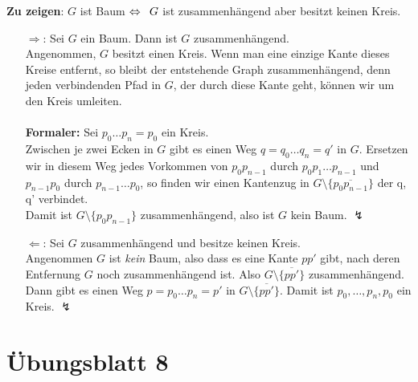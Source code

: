 \begin{problem*}[4]
  \textbf{Zu zeigen}: \( G \) ist Baum \( \Leftrightarrow \enskip G \) ist zusammenhängend aber besitzt keinen Kreis.
  \begin{itemize}
    \item[\( \Rightarrow \):] Sei \( G \) ein Baum. Dann ist \( G \) zusammenhängend. \\
    Angenommen, \( G \) besitzt einen Kreis. Wenn man eine einzige Kante dieses Kreise entfernt, so bleibt der entstehende Graph zusammenhängend, denn jeden verbindenden Pfad in \( G \), der durch diese Kante geht, können wir um den Kreis umleiten. \\ 
    \\
    \textbf{Formaler:} Sei \( p_0 \dots p_n = p_0 \) ein Kreis. \\
    Zwischen je zwei Ecken in \( G \) gibt es einen Weg \( q = q_0 \dots q_n = q' \) in \( G \). Ersetzen wir in diesem Weg jedes Vorkommen von \( p_0p_{n-1} \) durch \( p_0p_1 \dots p_{n-1} \) und \( p_{n-1}p_0 \) durch \( p_{n-1} \dots p_0 \), so finden wir einen Kantenzug in \( G \setminus \{ \overline{p_0p_{n-1}} \} \) der q, q' verbindet. \\
    Damit ist \( G \setminus \{ p_0p_{n-1} \} \) zusammenhängend, also ist \( G \) kein Baum. \quad \( \lightning \)

    \item[\( \Leftarrow \):] Sei \( G \) zusammenhängend und besitze keinen Kreis. \\
    Angenommen \( G \) ist \emph{kein} Baum, also dass es eine Kante \( pp' \) gibt, nach deren Entfernung \( G \) noch zusammenhängend ist. Also \( G \setminus \{ \overline{pp'} \} \) zusammenhängend. \\
    Dann gibt es einen Weg \( p = p_0 \dots p_n = p' \) in \( G \setminus \{ \overline{pp'} \} \). Damit ist \( p_0, \dots, p_n, p_0 \) ein Kreis. \quad \( \lightning \)
  \end{itemize}  
\end{problem*}



%
\section{Übungsblatt 8}

